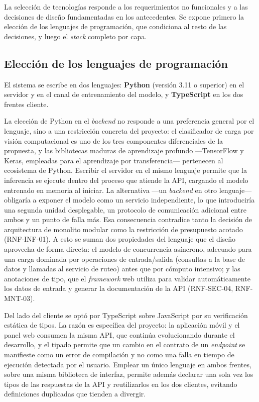 {La selección de tecnologías responde a los requerimientos no funcionales y a las decisiones de diseño fundamentadas en los antecedentes. Se expone primero la elección de los lenguajes de programación, que condiciona al resto de las decisiones, y luego el \emph{stack} completo por capa.

\subsection{Elección de los lenguajes de programación}

El sistema se escribe en dos lenguajes: \textbf{Python} (versión 3.11 o superior) en el servidor y en el canal de entrenamiento del modelo, y \textbf{TypeScript} en los dos frentes cliente.

La elección de Python en el \emph{backend} no responde a una preferencia general por el lenguaje, sino a una restricción concreta del proyecto: el clasificador de carga por visión computacional es uno de los tres componentes diferenciales de la propuesta, y las bibliotecas maduras de aprendizaje profundo —TensorFlow y Keras, empleadas para el aprendizaje por transferencia— pertenecen al ecosistema de Python. Escribir el servidor en el mismo lenguaje permite que la inferencia se ejecute dentro del proceso que atiende la API, cargando el modelo entrenado en memoria al iniciar. La alternativa —un \emph{backend} en otro lenguaje— obligaría a exponer el modelo como un servicio independiente, lo que introduciría una segunda unidad desplegable, un protocolo de comunicación adicional entre ambos y un punto de falla más. Esa consecuencia contradice tanto la decisión de arquitectura de monolito modular como la restricción de presupuesto acotado (RNF-INF-01). A esto se suman dos propiedades del lenguaje que el diseño aprovecha de forma directa: el modelo de concurrencia asíncrono, adecuado para una carga dominada por operaciones de entrada/salida (consultas a la base de datos y llamadas al servicio de ruteo) antes que por cómputo intensivo; y las anotaciones de tipo, que el \emph{framework} web utiliza para validar automáticamente los datos de entrada y generar la documentación de la API (RNF-SEC-04, RNF-MNT-03).

Del lado del cliente se optó por TypeScript sobre JavaScript por su verificación estática de tipos. La razón es específica del proyecto: la aplicación móvil y el panel web consumen la misma API, que continúa evolucionando durante el desarrollo, y el tipado permite que un cambio en el contrato de un \emph{endpoint} se manifieste como un error de compilación y no como una falla en tiempo de ejecución detectada por el usuario. Emplear un único lenguaje en ambos frentes, sobre una misma biblioteca de interfaz, permite además declarar una sola vez los tipos de las respuestas de la API y reutilizarlos en los dos clientes, evitando definiciones duplicadas que tienden a divergir.

}
